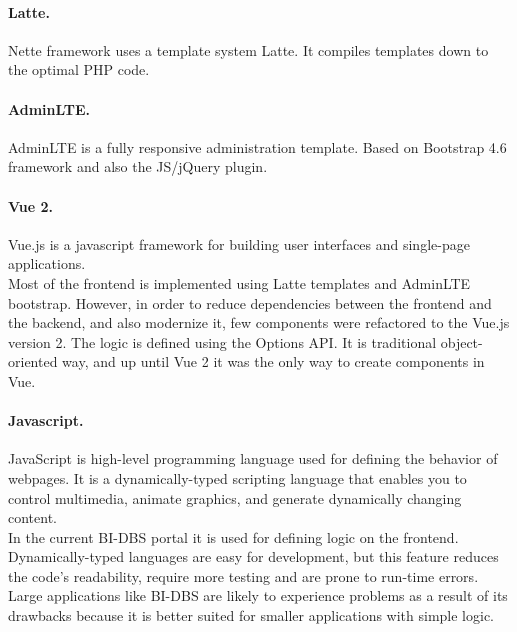 \paragraph*{Latte.} Nette framework uses a template system Latte. It compiles templates down to the optimal PHP code.

\paragraph*{AdminLTE.} AdminLTE is a fully responsive administration template. Based on Bootstrap 4.6 framework and also the JS/jQuery plugin. 

\paragraph*{Vue 2.} Vue.js is a javascript framework for building user interfaces and single-page applications.\\
Most of the frontend is implemented using Latte templates and AdminLTE bootstrap. However, in order to reduce dependencies between the frontend and the backend, and also modernize it, few components were refactored to the Vue.js version 2. The logic is defined using the Options API. It is traditional object-oriented way, and up until Vue 2 it was the only way to create components in Vue.

\paragraph*{Javascript.} JavaScript is high-level programming language used for defining the behavior of webpages. It is a dynamically-typed scripting language that enables you to control multimedia, animate graphics, and generate dynamically changing content.\\ 
In the current BI-DBS portal it is used for defining logic on the frontend. Dynamically-typed languages are easy for development, but this feature reduces the code's readability, require more testing and are prone to run-time errors. Large applications like BI-DBS are likely to experience problems as a result of its drawbacks because it is better suited for smaller applications with simple logic.







